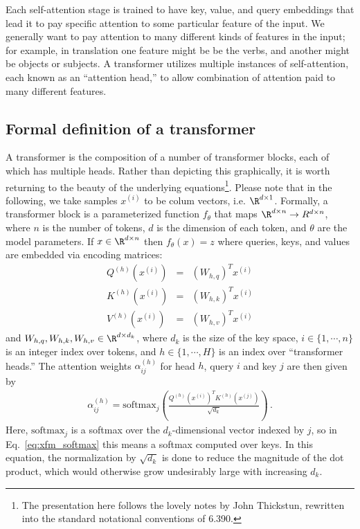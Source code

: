 Each self-attention stage is trained to have key, value, and query embeddings that lead it to pay specific attention to some particular feature of the input.  We generally want to pay attention to many different kinds of features in the input; for example, in translation one feature might be be the verbs, and another might be objects or subjects.  A transformer utilizes multiple instances of self-attention, each known as an ``attention head,'' to allow combination of attention paid to many different features.  

\subsection{Formal definition of a transformer}

%
%
%
A transformer is the composition of a number of transformer blocks, each of which has multiple heads.  Rather than depicting this graphically, it is worth returning to the beauty of the underlying equations\footnote{The presentation here follows the lovely notes by John Thickstun, rewritten into the standard notational conventions of 6.390.}.  Please note that in the following, we take samples $x^{(i)}$ to be colum vectors, i.e. $\R^{d \times 1}$.
%
Formally, a transformer block is a parameterized function $f_\theta$ that maps $\R^{d\times n}\rightarrow R^{d\times n}$, where $n$ is the number of tokens, $d$ is the dimension of each token, and $\theta$ are the model parameters.  If $x\in \R^{d\times n}$ then $f_\theta(x) = z$ where queries, keys, and values are embedded via encoding matrices:
\begin{eqnarray}
  Q^{(h)}(x^{(i)}) &=& (W_{h,q})^T x^{(i)}
\\
  K^{(h)}(x^{(i)}) &=& (W_{h,k})^T x^{(i)}
\\
  V^{(h)}(x^{(i)}) &=& (W_{h,v})^T x^{(i)}
\end{eqnarray}
and $W_{h,q}, W_{h,k}, W_{h,v} \in \R^{d\times d_k}$, where $d_k$ is the size of the key space, $i \in \{1,\cdots,n\}$ is an integer index over tokens, and $h \in \{1,\cdots,H\}$ is an index over ``transformer heads.''  The attention weights $\alpha^{(h)}_{ij}$ for head $h$, query $i$ and key $j$ are then given by
\begin{eqnarray}
  \alpha^{(h)}_{ij} = \text{softmax}_j \left( \frac{Q^{(h)}(x^{(i)})^T K^{(h)}(x^{(j)})}{\sqrt{d_k}}  \right)
\,.
\label{eq:xfm_softmax}
\end{eqnarray}
Here, $\text{softmax}_j$ is a softmax over the $d_k$-dimensional vector indexed by $j$, so in Eq.~\ref{eq:xfm_softmax} this means a softmax computed over keys.  In this equation, the normalization by $\sqrt{d_k}$ is done to reduce the magnitude of the dot product, which would otherwise grow undesirably large with increasing $d_k$.

